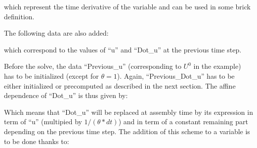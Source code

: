 \documentclass[a4paper,11pt,english]{sphinxmanual}
\begin{document}
\begin{sphinxVerbatim}[commandchars=\\\{\}]
\end{sphinxVerbatim}

which represent the time derivative of the variable and can be used in some brick definition.

The following data are also added:

\begin{sphinxVerbatim}[commandchars=\\\{\}]
 
\end{sphinxVerbatim}

which correspond to the values of “u” and “Dot\_u” at the previous time step.

Before the solve, the data  “Previous\_u” (corresponding to \(U^0\) in the example) has to be initialized (except for \(\theta = 1\)). Again, “Previous\_Dot\_u” has to be either initialized or pre\sphinxhyphen{}computed as described in the next section. The affine dependence of “Dot\_u” is thus given by:

\begin{sphinxVerbatim}[commandchars=\\\{\}]
      
\end{sphinxVerbatim}

Which means that “Dot\_u” will be replaced at assembly time by its expression in term of “u” (multipied by \(1/(\theta*dt)\)) and in term of a constant remaining part depending on the previous time step.
The addition of this scheme to a variable is to be done thanks to:

\begin{sphinxVerbatim}[commandchars=\\\{\}]
      
\end{sphinxVerbatim}
\end{document}
